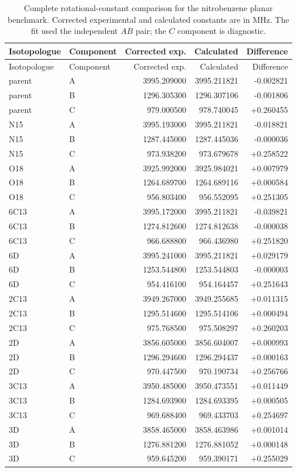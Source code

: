 \documentclass[12pt]{article}
\begin{document}
\begin{longtable}{llrrr}
\caption{Complete rotational-constant comparison for the nitrobenzene planar benchmark. Corrected experimental and calculated constants are in MHz. The fit used the independent $AB$ pair; the $C$ component is diagnostic.}\label{tab:si-nitrobenzene-rotconstants}\\
\toprule
Isotopologue & Component & Corrected exp. & Calculated & Difference \\
\midrule
\endfirsthead
\toprule
Isotopologue & Component & Corrected exp. & Calculated & Difference \\
\midrule
\endhead
parent & A & 3995.209000 & 3995.211821 & -0.002821 \\
parent & B & 1296.305300 & 1296.307106 & -0.001806 \\
parent & C & 979.000500 & 978.740045 & +0.260455 \\
N15 & A & 3995.193000 & 3995.211821 & -0.018821 \\
N15 & B & 1287.445000 & 1287.445036 & -0.000036 \\
N15 & C & 973.938200 & 973.679678 & +0.258522 \\
O18 & A & 3925.992000 & 3925.984021 & +0.007979 \\
O18 & B & 1264.689700 & 1264.689116 & +0.000584 \\
O18 & C & 956.803400 & 956.552095 & +0.251305 \\
6C13 & A & 3995.172000 & 3995.211821 & -0.039821 \\
6C13 & B & 1274.812600 & 1274.812638 & -0.000038 \\
6C13 & C & 966.688800 & 966.436980 & +0.251820 \\
6D & A & 3995.241000 & 3995.211821 & +0.029179 \\
6D & B & 1253.544800 & 1253.544803 & -0.000003 \\
6D & C & 954.416100 & 954.164457 & +0.251643 \\
2C13 & A & 3949.267000 & 3949.255685 & +0.011315 \\
2C13 & B & 1295.514600 & 1295.514106 & +0.000494 \\
2C13 & C & 975.768500 & 975.508297 & +0.260203 \\
2D & A & 3856.605000 & 3856.604007 & +0.000993 \\
2D & B & 1296.294600 & 1296.294437 & +0.000163 \\
2D & C & 970.447500 & 970.190734 & +0.256766 \\
3C13 & A & 3950.485000 & 3950.473551 & +0.011449 \\
3C13 & B & 1284.693900 & 1284.693395 & +0.000505 \\
3C13 & C & 969.688400 & 969.433703 & +0.254697 \\
3D & A & 3858.465000 & 3858.463986 & +0.001014 \\
3D & B & 1276.881200 & 1276.881052 & +0.000148 \\
3D & C & 959.645200 & 959.390171 & +0.255029 \\
\bottomrule
\end{longtable}
\end{document}
